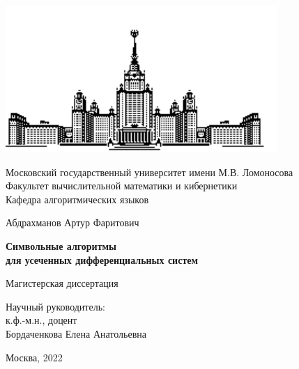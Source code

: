 \begin{titlepage}
    \begin{center}
        \includegraphics[scale=1]{титульник/msu-eps-converted-to.pdf}
        
        Московский государственный университет имени М.В. Ломоносова \\
        Факультет вычислительной математики и кибернетики \\
        Кафедра алгоритмических языков \\
        \vspace{1cm}

        \vspace{6em}

        Абдрахманов Артур Фаритович \\
    \end{center}

    \vspace{1.2em}

    \begin{center}
        \Large
        \textbf{Символьные алгоритмы \\
        для усеченных дифференциальных систем}
    \end{center}

    \vspace{5em}

    \begin{center}
        Магистерская диссертация
    \end{center}
    
    \vspace{6em}

    \begin{flushright}
        Научный руководитель: \\
        к.ф.-м.н., доцент \\
        Бордаченкова Елена Анатольевна \\
    \end{flushright}

    \vspace{\fill}

    \begin{center}
        Москва, 2022
    \end{center}

\end{titlepage}